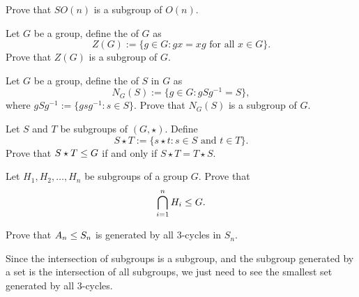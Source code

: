 \documentclass{ximera}
\begin{document}
\begin{exercise}
  Prove that $SO(n)$ is a subgroup of $O(n)$.
\end{exercise}


\begin{exercise}\label{E:center}
  Let $G$ be a group, define the  of $G$ as
  \[
  Z(G):=\{g\in G: \text{$gx=xg$ for all $x\in G$}\}.
  \]
  Prove that $Z(G)$ is a subgroup of $G$.
\end{exercise}


\begin{exercise}
  Let $G$ be a group, define the  of $S$ in $G$ as
  \[
  N_G(S):=\{g\in G: \text{$gSg^{-1} = S$}\},
  \]
  where $gSg^{-1}:=\{g sg^{-1}:s\in S\}$. Prove that $N_G(S)$ is a
  subgroup of $G$.
\end{exercise}



\begin{exercise}
  Let $S$ and $T$ be subgroups of $(G,\star)$. Define
  \[
  S\star T := \{ s\star t: \text{$s\in S$ and $t\in T$}\}.
  \]
  Prove that $S\star T\leq G$ if and only if $S\star T = T\star S$.
\end{exercise}






\begin{exercise}
  Let $H_1,H_2,\dots,H_n$ be subgroups of a group $G$. Prove that
  \[
  \bigcap_{i=1}^n H_i \leq G.
  \]
\end{exercise}





\begin{exercise}
  Prove that $A_n\leq S_n$ is generated by all $3$-cycles in $S_n$.
  \begin{hint}
    Since the intersection of subgroups is a subgroup, and the
    subgroup generated by a set is the intersection of all subgroups,
    we just need to see the smallest set generated by all $3$-cycles. 
  \end{hint}
\end{exercise}
\end{document}

